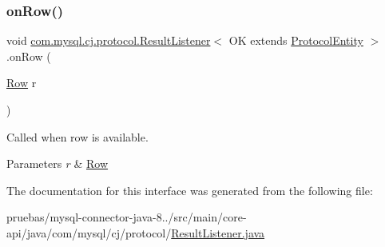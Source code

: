 \subsubsection{\texorpdfstring{on\+Row()}{onRow()}}
{\footnotesize\ttfamily void \mbox{\hyperlink{interfacecom_1_1mysql_1_1cj_1_1protocol_1_1_result_listener}{com.\+mysql.\+cj.\+protocol.\+Result\+Listener}}$<$ OK extends \mbox{\hyperlink{interfacecom_1_1mysql_1_1cj_1_1protocol_1_1_protocol_entity}{Protocol\+Entity}} $>$.on\+Row (\begin{DoxyParamCaption}\item[{\mbox{\hyperlink{interfacecom_1_1mysql_1_1cj_1_1result_1_1_row}{Row}}}]{r }\end{DoxyParamCaption})}

Called when row is available.


\begin{DoxyParams}{Parameters}
{\em r} & \mbox{\hyperlink{}{Row}} \\
\hline
\end{DoxyParams}


The documentation for this interface was generated from the following file\+:\begin{DoxyCompactItemize}
\item 
pruebas/mysql-\/connector-\/java-\/8../src/main/core-\/api/java/com/mysql/cj/protocol/\mbox{\hyperlink{_result_listener_8java}{Result\+Listener.\+java}}\end{DoxyCompactItemize}
